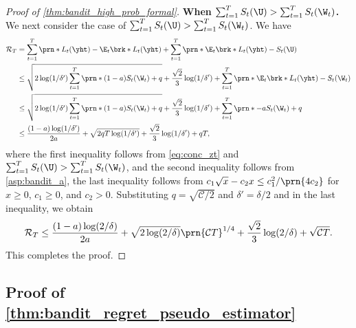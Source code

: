 \begin{proof}[Proof of \cref{thm:bandit_high_prob_formal}]
\textbf{When $\sum_{t=1}^T S_t(\U) > \sum_{t=1}^T S_t(\W_t)$.}
We next consider the case of $\sum_{t=1}^T S_t(\U) > \sum_{t=1}^T S_t(\W_t)$.
We have
\begin{align}
    \mathcal{R}_T 
    &=
    \sum_{t=1}^T \prn*{ L_t(\yht) - \E_t\brk*{ L_t(\yht)} }
    +
    \sum_{t=1}^T \prn*{ \E_t\brk*{ L_t(\yht)} - S_t(\U) }
    \nonumber \\
    &\leq
    \sqrt{2 \log (1/\delta') \sum_{t=1}^T \prn*{(1-a) S_t(\W_t) + q} }
    +
    \frac{\sqrt{2}}{3} \log (1/\delta')
    +
    \sum_{t=1}^T \prn*{ \E_t\brk*{ L_t(\yht)} - S_t(\W_t) }
    \nonumber \\
    &\leq
    \sqrt{2 \log (1/\delta') \sum_{t=1}^T \prn*{(1-a) S_t(\W_t) + q} }
    +
    \frac{\sqrt{2}}{3} \log (1/\delta')
    +
    \sum_{t=1}^T \prn*{ - a S_t(\W_t) + q }
    \nonumber \\
    &\leq
    \frac{(1 - a) \log (1/ \delta')}{ 2 a }
    +
    \sqrt{2 q T \log (1/\delta') }
    +
    \frac{\sqrt{2}}{3} \log (1/\delta')
    +
    q T
    ,
    \nonumber
\end{align}
where the first inequality follows from \eqref{eq:conc_zt} and $\sum_{t=1}^T S_t(\U) > \sum_{t=1}^T S_t(\W_t)$,
and the second inequality follows from \cref{asp:bandit_a},
the last inequality follows from $c_1\sqrt{x}-c_2x\leq{c_1^2}/\prn{4c_2}$ for $x \geq 0$, $c_1 \geq 0$, and $c_2 > 0$.
Substituting $q = \sqrt{\mathcal{C} / 2}$ and $\delta' = \delta/2$ and  in the last inequality, we obtain
\begin{equation}
    \mathcal{R}_T 
    \leq
    \frac{(1 - a) \log (2/ \delta)}{ 2 a }
    +
    \sqrt{2 \log (2/\delta) } \prn{ \mathcal{C} T }^{1/4}
    +
    \frac{\sqrt{2}}{3} \log (2/\delta)
    +
    \sqrt{\mathcal{C} T}
    .
    \nonumber
\end{equation}
This completes the proof.    
\end{proof}







\subsection{Proof of \cref{thm:bandit_regret_pseudo_estimator}}
\label{app:sub_bandit_regret_pseudo_estimator}


